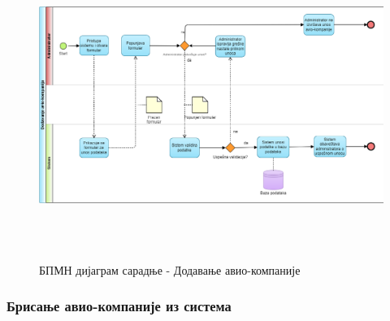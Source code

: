 \documentclass{article}
\begin{document}
\begin{figure}[H]
    \centering
    \includegraphics[width=1.1\textwidth, height=10cm]{Dijagrami_slike/dodavanje_avio_kompanije.png}
    \caption{БПМН дијаграм сарадње - Додавање авио-компаније}
\end{figure}

\newpage
\subsubsection{Брисање авио-компаније из система}
\end{document}
